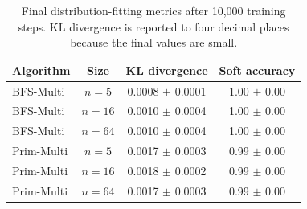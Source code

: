 \begin{table}[hbt!]
    \centering
    \small
    \begin{tabular}{lccc}
        \toprule
        \textbf{Algorithm} & \textbf{Size} & \textbf{KL divergence} & \textbf{Soft accuracy} \\
        \midrule
        BFS-Multi & $n=5$ & 0.0008 $\pm$ 0.0001 & 1.00 $\pm$ 0.00 \\
        BFS-Multi & $n=16$ & 0.0010 $\pm$ 0.0004 & 1.00 $\pm$ 0.00 \\
        BFS-Multi & $n=64$ & 0.0010 $\pm$ 0.0004 & 1.00 $\pm$ 0.00 \\
        Prim-Multi & $n=5$ & 0.0017 $\pm$ 0.0003 & 0.99 $\pm$ 0.00 \\
        Prim-Multi & $n=16$ & 0.0018 $\pm$ 0.0002 & 0.99 $\pm$ 0.00 \\
        Prim-Multi & $n=64$ & 0.0017 $\pm$ 0.0003 & 0.99 $\pm$ 0.00 \\
        \bottomrule
    \end{tabular}
    \caption{Final distribution-fitting metrics after 10,000 training steps. KL divergence is reported to four decimal places because the final values are small.}
    \label{tab:distribution-fitting-validation}
\end{table}
